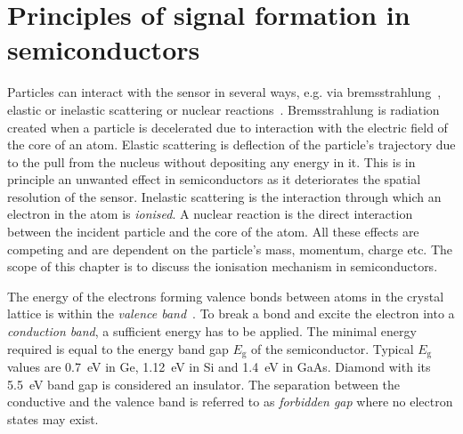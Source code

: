 \section{Principles of signal formation in semiconductors}
\label{sec:princsigfor}
Particles can interact with the sensor in several ways, e.g. via bremsstrahlung~\cite{BREMS:00000}, elastic or inelastic scattering or nuclear reactions~\cite{PARMA:00000}. Bremsstrahlung is radiation created when a particle is decelerated due to interaction with the electric field of the core of an atom. Elastic scattering is deflection of the particle's trajectory due to the pull from the nucleus without depositing any energy in it. This is in principle an unwanted effect in semiconductors as it deteriorates the spatial resolution of the sensor. Inelastic scattering is the interaction through which an electron in the atom is \emph{ionised}. A nuclear reaction is the direct interaction between the incident particle and the core of the atom. All these effects are competing and are dependent on the particle's mass, momentum, charge etc. The scope of this chapter is to discuss the ionisation mechanism in semiconductors.

The energy of the electrons forming valence bonds between atoms in the crystal lattice is within the \emph{valence band}~\cite{PHSEM:00000}. To break a bond and excite the electron into a \emph{conduction band}, a sufficient energy has to be applied. The minimal energy required is equal to the energy band gap $E_\mathrm{g}$ of the semiconductor. Typical $E_\mathrm{g}$ values are 0.7~eV in Ge, 1.12~eV in Si and 1.4~eV in GaAs. Diamond with its 5.5~eV band gap is considered an insulator. The separation between the conductive and the valence band is referred to as \emph{forbidden gap} where no electron states may exist.


